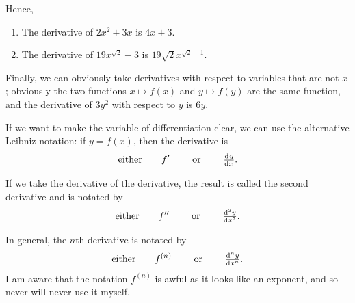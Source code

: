 Hence,
\begin{ex}\leavevmode
  \begin{enumerate}
    \item The derivative of $ 2x^2 + 3x $ is $ 4x + 3 $.
    \item The derivative of $ 19x^{\sqrt{2}} - 3 $ is $ 19\sqrt{2}x^{\sqrt{2} - 1} $.
  \end{enumerate}
\end{ex}

Finally, we can obviously take derivatives with respect to variables that are not $ x $;
obviously the two functions $ x \mapsto f(x) $ and $ y \mapsto f(y) $ are the same function,
and the derivative of $ 3y^2 $ with respect to $ y $ is $ 6y $.

If we want to make the variable of differentiation clear, we can use the alternative Leibniz
notation: if $ y = f(x) $, then the derivative is
\begin{displaymath}
  \text{either} \qquad f' \qquad\text{ or }\qquad \od{y}{x}.
\end{displaymath}

If we take the derivative of the derivative, the result is called the second derivative and
is notated by
\begin{displaymath}
  \text{either} \qquad f'' \qquad\text{ or }\qquad \od[2]{y}{x}.
\end{displaymath}

In general, the $n$th derivative is notated by
\begin{displaymath}
  \text{either} \qquad f^{(n)} \qquad\text{ or }\qquad \od[n]{y}{x}.
\end{displaymath}
I am aware that the notation $ f^{(n)} $ is awful as it looks like an exponent, and so never will
never use it myself.

\clearpage
